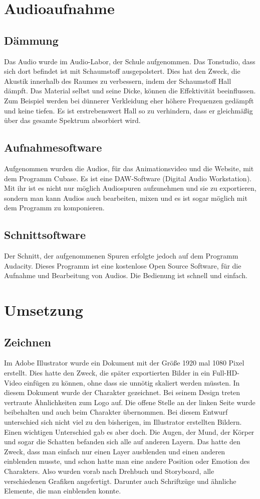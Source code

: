 \section{Audioaufnahme}
\subsection{Dämmung}
Das Audio wurde im Audio-Labor, der Schule aufgenommen. Das Tonstudio, dass sich dort befindet ist mit Schaumstoff ausgepolstert. Dies hat den Zweck, die Akustik innerhalb des Raumes zu verbessern, indem der Schaumstoff Hall dämpft. Das Material selbst und seine Dicke, können die Effektivität beeinflussen. Zum Beispiel werden bei dünnerer Verkleidung eher höhere Frequenzen gedämpft und keine tiefen. Es ist erstrebenswert Hall so zu verhindern, dass er gleichmäßig über das gesamte Spektrum absorbiert wird.\cite{damm} 
\subsection{Aufnahmesoftware}
Aufgenommen wurden die Audios, für das Animationsvideo und die Website, mit dem Programm Cubase. Es ist eine DAW-Software (Digital Audio Workstation). Mit ihr ist es nicht nur möglich Audiospuren aufzunehmen und sie zu exportieren, sondern man kann Audios auch bearbeiten, mixen und es ist sogar möglich mit dem Programm zu komponieren.\cite{cube}
\subsection{Schnittsoftware}
Der Schnitt, der aufgenommenen Spuren erfolgte jedoch auf dem Programm Audacity. Dieses Programm ist eine kostenlose Open Source Software, für die Aufnahme und Bearbeitung von Audios. Die Bedienung ist schnell und einfach.\cite{auda}
\section{Umsetzung}
\subsection{Zeichnen}
\renewcommand{\kapitelautor}{Autor: Niklas Kienreich}
Im Adobe Illustrator wurde ein Dokument mit der Größe 1920 mal 1080 Pixel erstellt. Dies hatte den Zweck, die später exportierten Bilder in ein Full-HD-Video einfügen zu können, ohne dass sie unnötig skaliert werden müssten. In diesem Dokument wurde der Charakter gezeichnet. Bei seinem Design treten vertraute Ähnlichkeiten zum Logo auf. Die offene Stelle an der linken Seite wurde beibehalten und auch beim Charakter übernommen. Bei diesem Entwurf unterschied sich nicht viel zu den bisherigen, im Illustrator erstellten Bildern. Einen wichtigen Unterschied gab es aber doch. Die Augen, der Mund, der Körper und sogar die Schatten befanden sich alle auf anderen Layern. Das hatte den Zweck, dass man einfach nur einen Layer ausblenden und einen anderen einblenden musste, und schon hatte man eine andere Position oder Emotion des Charakters. Also wurden vorab nach Drehbuch und Storyboard, alle verschiedenen Grafiken angefertigt. Darunter auch Schriftzüge und ähnliche Elemente, die man einblenden konnte.

